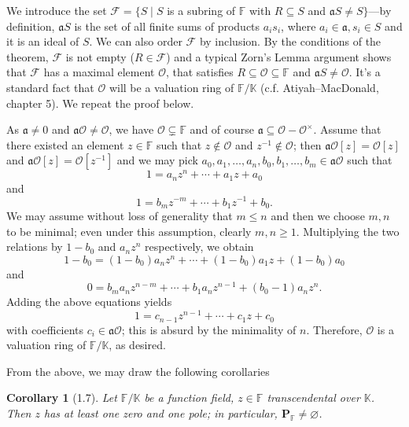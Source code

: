 \documentclass[11pt]{article}
\makeatletter
\theoremstyle{scplain}
\newtheorem*{corollary}{Corollary}
\renewenvironment{proof}[1][\proofname]{%
  \par\pushQED{\qed}\normalfont\topsep6\p@\@plus6\p@\relax
  \trivlist\item[\hskip\labelsep\scshape #1\@addpunct{.}]\ignorespaces}%
  {\popQED\endtrivlist\@endpefalse}
\makeatother
\begin{document}
\begin{proof}
We introduce the set $\mathcal{F} = \{S \mid S$ is a subring of $\mathbb{F}$ with
$R \subseteq S$ and $\mathfrak{a}S \neq S\}$---by definition, $\mathfrak{a}S$ is
the set of all finite sums of products $a_i s_i$, where $a_i \in \mathfrak{a},
s_i \in S$ and it is an ideal of $S$. We can also order $\mathcal{F}$ by
inclusion. By the conditions of the theorem, $\mathcal{F}$ is not empty
($R \in \mathcal{F}$) and a typical Zorn's Lemma argument shows that $\mathcal{F}$
has a maximal element $\mathcal{O}$, that satisfies
$R \subseteq \mathcal{O} \subseteq \mathbb{F}$ and $\mathfrak{a}S \neq \mathcal{O}$.
It's a standard fact that $\mathcal{O}$ will be a valuation ring of
$\mathbb{F}/\mathbb{K}$ (c.f. Atiyah--MacDonald, chapter 5). We repeat the proof
below.

As $\mathfrak{a} \neq 0$ and $\mathfrak{a}\mathcal{O} \neq \mathcal{O}$, we have
$\mathcal{O} \subsetneq \mathbb{F}$ and of course
$\mathfrak{a} \subseteq \mathcal{O} - \mathcal{O}^\times$. Assume that there
existed an element $z \in \mathbb{F}$ such that $z \notin \mathcal{O}$ and
$z^{-1} \notin \mathcal{O}$; then $\mathfrak{a}\mathcal{O}[z] = \mathcal{O}[z]$ and
$\mathfrak{a}\mathcal{O}[z] = \mathcal{O}[z^{-1}]$ and we may pick
$a_0, a_1, \ldots, a_n, b_0, b_1, \ldots, b_m \in \mathfrak{a}\mathcal{O}$ such
that
\[
  1 = a_n z^n + \cdots + a_1 z + a_0
\]
and
\[
  1 = b_m z^{-m} + \cdots + b_1 z^{-1} + b_0.
\]
We may assume without loss of generality that $m \leq n$ and then we choose
$m, n$ to be minimal; even under this assumption, clearly $m, n \geq 1$.
Multiplying the two relations by $1 - b_0$ and $a_n z^n$ respectively, we obtain
\[
  1 - b_0 = (1 - b_0)a_n z^n + \cdots + (1 - b_0)a_1 z + (1 - b_0)a_0
\]
and
\[
  0 = b_m a_n z^{n-m} + \cdots + b_1 a_n z^{n-1} + (b_0 - 1)a_n z^n.
\]
Adding the above equations yields
\[
  1 = c_{n-1} z^{n-1} + \cdots + c_1 z + c_0
\]
with coefficients $c_i \in \mathfrak{a}\mathcal{O}$; this is absurd by the
minimality of $n$. Therefore, $\mathcal{O}$ is a valuation ring of
$\mathbb{F}/\mathbb{K}$, as desired.
\end{proof}

From the above, we may draw the following corollaries

\begin{corollary}[1.7]
Let $\mathbb{F}/\mathbb{K}$ be a function field, $z \in \mathbb{F}$ transcendental
over $\mathbb{K}$. Then $z$ has at least one zero and one pole; in particular,
$\mathbf{P}_{\mathbb{F}} \neq \varnothing$.
\end{corollary}
\end{document}

